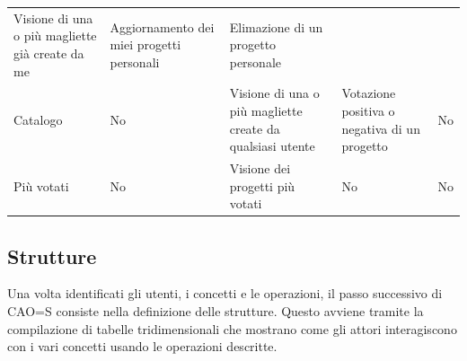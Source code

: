 \documentclass[12pt,italian,]{report}
\begin{document}
\begin{longtable}[]{@{}lllll@{}}
\begin{minipage}[t]{0.17\columnwidth}
Visione di una o più magliette già create da me\strut
\end{minipage} & \begin{minipage}[t]{0.17\columnwidth}\raggedright
Aggiornamento dei miei progetti personali\strut
\end{minipage} & \begin{minipage}[t]{0.17\columnwidth}\raggedright
Elimazione di un progetto personale\strut
\end{minipage}\tabularnewline
\begin{minipage}[t]{0.17\columnwidth}\raggedright
Catalogo\strut
\end{minipage} & \begin{minipage}[t]{0.17\columnwidth}\raggedright
No\strut
\end{minipage} & \begin{minipage}[t]{0.17\columnwidth}\raggedright
Visione di una o più magliette create da qualsiasi utente\strut
\end{minipage} & \begin{minipage}[t]{0.17\columnwidth}\raggedright
Votazione positiva o negativa di un progetto\strut
\end{minipage} & \begin{minipage}[t]{0.17\columnwidth}\raggedright
No\strut
\end{minipage}\tabularnewline
\begin{minipage}[t]{0.17\columnwidth}\raggedright
Più votati\strut
\end{minipage} & \begin{minipage}[t]{0.17\columnwidth}\raggedright
No\strut
\end{minipage} & \begin{minipage}[t]{0.17\columnwidth}\raggedright
Visione dei progetti più votati\strut
\end{minipage} & \begin{minipage}[t]{0.17\columnwidth}\raggedright
No\strut
\end{minipage} & \begin{minipage}[t]{0.17\columnwidth}\raggedright
No\strut
\end{minipage}\tabularnewline
\bottomrule
\end{longtable}

\subsection{Strutture}\label{strutture}

Una volta identificati gli utenti, i concetti e le operazioni, il passo
successivo di CAO=S consiste nella definizione delle strutture. Questo
avviene tramite la compilazione di tabelle tridimensionali che mostrano
come gli attori interagiscono con i vari concetti usando le operazioni
descritte.
\end{document}
